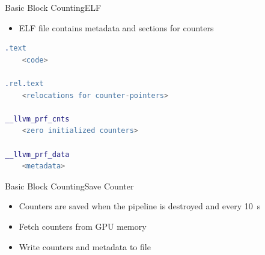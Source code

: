 \documentclass[xcolor={usenames,dvipsnames}, aspectratio=169, 12pt]{beamer}
\begin{document}
\begin{frame}[fragile]{Basic Block Counting}{ELF}
\begin{itemize}
	\item ELF file contains metadata and sections for counters
\end{itemize}

\begin{lstlisting}[language=erlang, morekeywords={text, rel, __llvm_prf_cnts, __llvm_prf_data}]
.text
	<code>

.rel.text
	<relocations for counter-pointers>

__llvm_prf_cnts
	<zero initialized counters>

__llvm_prf_data
	<metadata>
\end{lstlisting}
\end{frame}
\framelogo{}

{
\begin{frame}{Basic Block Counting}{Save Counter}
\begin{itemize}
	\item Counters are saved when the pipeline is destroyed and every \SI{10}{\second}
	\item Fetch counters from GPU memory
	\item Write counters and metadata to file
\end{itemize}
\end{frame}}
\end{document}
